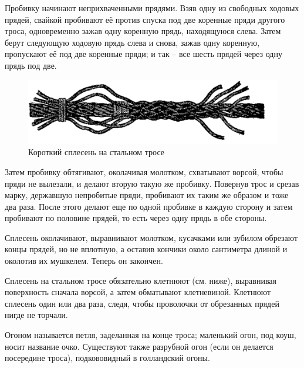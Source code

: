 \documentclass[a4paper, 12pt, twoside, final]{scrbook}
\begin{document}
Пробивку начинают неприхваченными прядями. Взяв одну из свободных ходовых прядей, свайкой пробивают её против спуска под две коренные пряди другого троса, одновременно зажав одну коренную прядь, находящуюся слева. Затем берут следующую ходовую прядь слева и снова, зажав одну коренную, пропускают её под две коренные пряди; и так \--- все шесть прядей через одну прядь под две.


\begin{figure}[htbp]
   \centering
   \includegraphics{65_Splesen_na_stalnom_trose} %
   \caption{Короткий сплесень на стальном тросе}
   \label{fig:65}
\end{figure}

Затем пробивку обтягивают, околачивая молотком, схватывают ворсой, чтобы пряди не вылезали, и делают вторую такую же пробивку. Повернув трос и срезав марку, державшую непробитые пряди, пробивают их таким же образом и тоже два раза. После этого делают еще по одной пробивке в каждую сторону и затем пробивают по половине прядей, то есть через одну прядь в обе стороны.

Сплесень околачивают, выравнивают молотком, кусачками или зубилом обрезают концы прядей, но не вплотную, а оставив кончики около сантиметра длиной и околотив их мушкелем. Теперь он закончен.

Сплесень на стальном тросе обязательно клетнюют (см. ниже), выравнивая поверхность сначала ворсой, а затем обматывают клетневиной. Клетнюют сплесень один или два раза, следя, чтобы проволочки от обрезанных прядей нигде не торчали.

Огоном называется петля, заделанная на конце троса; маленький огон, под коуш, носит название очко. Существуют также разрубной огон (если он делается посередине троса), подкововидный в голландский огоны.
\end{document}
